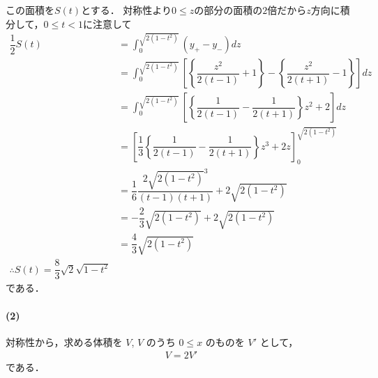 \documentclass[../../main.tex]{subfiles}
\begin{document}
この面積を$S(t)$とする．
対称性より$0 \le z$の部分の面積の$2$倍だから$z$方向に積分して，$0 \le t < 1$に注意して
\begin{align}
  \dfrac{1}{2} S(t)
  &= \int_{0}^{\sqrt{2(1-t^2)}} (y_{+}-y_{-}) dz \\
  &= \int_{0}^{\sqrt{2(1-t^2)}} \left[\left\{\dfrac{z^2}{2(t-1)}+1\right\} - \left\{\dfrac{z^2}{2(t+1)}-1\right\} \right] dz \\
  &= \int_{0}^{\sqrt{2(1-t^2)}} \left[\left\{\dfrac{1}{2(t-1)}-\dfrac{1}{2(t+1)}\right\}z^2 + 2 \right] dz \\
  &= \left[\dfrac{1}{3}\left\{\dfrac{1}{2(t-1)}-\dfrac{1}{2(t+1)}\right\}z^3 + 2z \right]_{0}^{\sqrt{2(1-t^2)}} \\
  &= \dfrac{1}{6}\dfrac{2\sqrt{2(1-t^2)}^3}{(t-1)(t+1)} + 2\sqrt{2(1-t^2)} \\
  &= - \dfrac{2}{3}\sqrt{2(1-t^2)} + 2\sqrt{2(1-t^2)} \\
  &= \dfrac{4}{3}\sqrt{2(1-t^2)} \\
  \therefore
  S(t) = \dfrac{8}{3} \sqrt{2} \sqrt{1-t^2} \label{eq:8}
\end{align}
である．

\paragraph{(2)}

対称性から，求める体積を $V$, $V$ のうち $0 \le x$ のものを $V'$ として，
\begin{align}
  V = 2 V' \label{eq:9}
\end{align}
である．
\end{document}
